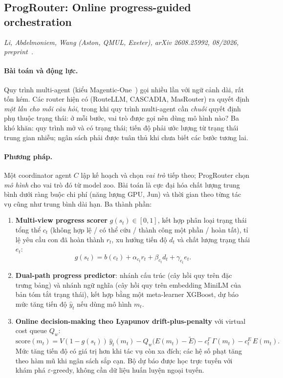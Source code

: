 \subsection{ProgRouter: Online progress-guided orchestration}
\label{sec:progrouter}

\noindent\textit{Li, Abdelmoniem, Wang (Aston, QMUL, Exeter), arXiv 2608.25992, 08/2026, preprint~\cite{p3progrouter}.}

\paragraph{Bài toán và động lực.} Quy trình multi-agent (kiểu Magentic-One~\cite{magenticone}) gọi \LLM{} nhiều lần với ngữ cảnh dài, rất tốn kém. Các router hiện có (RouteLLM, CASCADIA, MasRouter) ra quyết định \emph{một lần cho mỗi câu hỏi}, trong khi quy trình multi-agent cần \emph{chuỗi} quyết định phụ thuộc trạng thái: ở mỗi bước, vai trò được gọi nên dùng mô hình nào? Ba khó khăn: quy trình mở và có trạng thái; tiến độ phải ước lượng từ trạng thái trung gian nhiễu; ngân sách phải được tuân thủ khi chưa biết các bước tương lai.

\paragraph{Phương pháp.} Một coordinator agent $C$ lập kế hoạch và chọn \emph{vai trò} tiếp theo; ProgRouter chọn \emph{mô hình} cho vai trò đó từ model zoo. Bài toán là cực đại hóa chất lượng trung bình dưới ràng buộc chi phí (năng lượng GPU, Jun) và thời gian theo từng tác vụ cũng như trung bình dài hạn. Ba thành phần:
\begin{enumerate}
  \item \textbf{Multi-view progress scorer} $g(s_t)\in[0,1]$, kết hợp phân loại trạng thái tổng thể $c_t$ (không hợp lệ / có thể cứu / thành công một phần / hoàn tất), tỉ lệ yêu cầu con đã hoàn thành $r_t$, xu hướng tiến độ $d_t$ và chất lượng trạng thái $e_t$:
  \begin{equation}
    g(s_t) = b(c_t) + \alpha_{c_t} r_t + \beta_{c_t} d_t + \gamma_{c_t} e_t.
  \end{equation}
  \item \textbf{Dual-path progress predictor}: nhánh cấu trúc (cây hồi quy trên đặc trưng bảng) và nhánh ngữ nghĩa (cây hồi quy trên embedding MiniLM của bản tóm tắt trạng thái), kết hợp bằng một meta-learner XGBoost, dự báo mức tăng tiến độ $\hat y_t$ nếu dùng mô hình $m_t$.
  \item \textbf{Online decision-making theo Lyapunov drift-plus-penalty} với virtual cost queue $Q_w$:
  \begin{equation}
    \text{score}(m_t) = V(1-g(s_t))\,\hat y_t(m_t) - Q_w\big(E(m_t)-\tilde E\big) - c^{\Gamma}_t\,\Gamma(m_t) - c^{E}_t\,E(m_t).
  \end{equation}
  Mức tăng tiến độ có giá trị hơn khi tác vụ còn xa đích; các hệ số phạt tăng theo hàm mũ khi ngân sách sắp cạn. Bộ dự báo được học trực tuyến với khám phá $\varepsilon$-greedy, không cần dữ liệu huấn luyện ngoại tuyến.
\end{enumerate}

